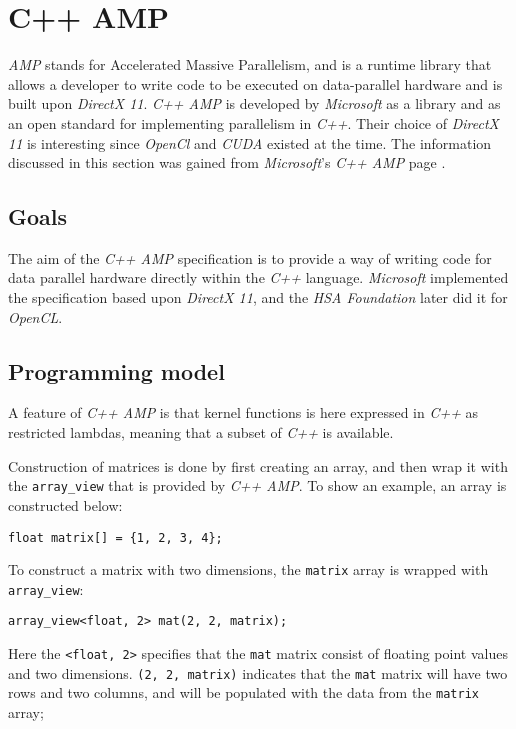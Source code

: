 \section{C++ AMP} \label{cha:cppAmpRelWork}
\textit{AMP} stands for Accelerated Massive Parallelism, and is a runtime library that allows a developer to write code to be executed on data-parallel hardware and is built upon \textit{DirectX 11}. \textit{C++ AMP} is developed by \textit{Microsoft} as a library and as an open standard for implementing parallelism in \textit{C++}. Their choice of \textit{DirectX 11} is interesting since \textit{OpenCl} and \textit{CUDA} existed at the time. The information discussed in this section was gained from \textit{Microsoft}'s \textit{C++ AMP} page \cite{microsoftCppAMP}.


\subsection{Goals}
The aim of the \textit{C++ AMP} specification is to provide a way of writing code for data parallel hardware directly within the \textit{C++} language. \textit{Microsoft} implemented the specification based upon \textit{DirectX 11}, and the \textit{HSA Foundation} later did it for \textit{OpenCL}.

\subsection{Programming model}
A feature of \textit{C++ AMP} is that kernel functions is here expressed in \textit{C++} as restricted lambdas, meaning that a subset of \textit{C++} is available. 

Construction of matrices is done by first creating an array, and then wrap it with the \texttt{array\_view} that is provided by \textit{C++ AMP}. To show an example, an array is constructed below:
\begin{lstlisting}
float matrix[] = {1, 2, 3, 4}; 
\end{lstlisting}
To construct a matrix with two dimensions, the \texttt{matrix} array is wrapped with \texttt{array\_view}:
\begin{lstlisting}
array_view<float, 2> mat(2, 2, matrix); 
\end{lstlisting}
Here the \texttt{<float, 2>} specifies that the \texttt{mat} matrix consist of floating point values and two dimensions. \texttt{(2, 2, matrix)} indicates that the \texttt{mat} matrix will have two rows and two columns, and will be populated with the data from the \texttt{matrix} array;


